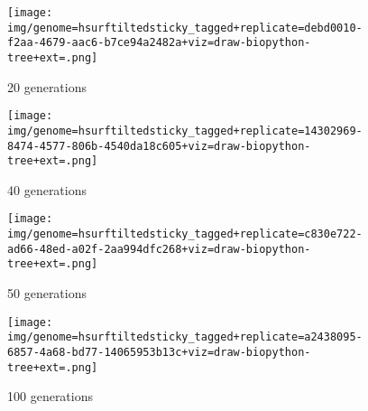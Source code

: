 \begin{figure*}
  \begin{subfigure}[b]{\textwidth}
    \centering
    \texttt{[image: img/genome=hsurftiltedsticky\_tagged+replicate=debd0010-f2aa-4679-aac6-b7ce94a2482a+viz=draw-biopython-tree+ext=.png]}
    \caption{20 generations}
  \end{subfigure}

  \begin{subfigure}[b]{\textwidth}
    \centering
    \texttt{[image: img/genome=hsurftiltedsticky\_tagged+replicate=14302969-8474-4577-806b-4540da18c605+viz=draw-biopython-tree+ext=.png]}
    \caption{40 generations}
  \end{subfigure}

  \begin{subfigure}[b]{\textwidth}
    \centering
    \texttt{[image: img/genome=hsurftiltedsticky\_tagged+replicate=c830e722-ad66-48ed-a02f-2aa994dfc268+viz=draw-biopython-tree+ext=.png]}
    \caption{50 generations}
  \end{subfigure}

  \begin{subfigure}[b]{\textwidth}
    \centering
    \texttt{[image: img/genome=hsurftiltedsticky\_tagged+replicate=a2438095-6857-4a68-bd77-14065953b13c+viz=draw-biopython-tree+ext=.png]}
    \caption{100 generations}
  \end{subfigure}
\end{figure*}
